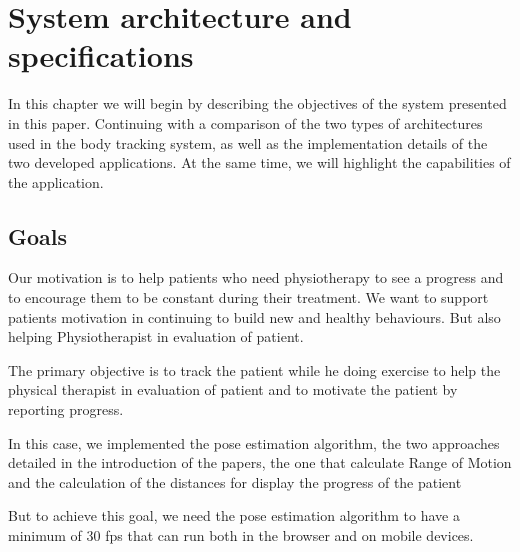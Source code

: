 
\chapter{System architecture and specifications}

In this chapter we will begin by describing the objectives 
of the system presented in this paper. Continuing with a comparison of the two types of architectures used 
in the body tracking system, as well as the implementation details of the two developed applications.
 At the same time, we will highlight the capabilities of the application.

\section{Goals}

\par Our motivation is to help patients who need physiotherapy to see a progress and to encourage them to be 
constant during their treatment. We want to support patients motivation in continuing to build new and 
 healthy behaviours. But also helping Physiotherapist in evaluation of patient.

The primary objective is to track the patient while he doing exercise to help 
the physical therapist in evaluation of patient and to motivate the patient by reporting progress.


In this case, we implemented the pose estimation algorithm, 
the two approaches detailed in the introduction of the papers, 
the one that calculate Range of Motion  and the calculation of the distances for display the progress of the patient

But to achieve this goal, 
we need the pose estimation algorithm to have a minimum of 30 fps that can run both in the browser and on mobile devices.

